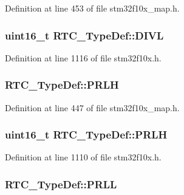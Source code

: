 Definition at line 453 of file stm32f10x\+\_\+map.\+h.

\subsubsection[{\texorpdfstring{D\+I\+VL}{DIVL}}]{ {\bf uint16\+\_\+t} R\+T\+C\+\_\+\+Type\+Def\+::\+D\+I\+VL}\hypertarget{struct_r_t_c___type_def_ad0c75a7cc4e925da0faedcd8860cb43a}{}\label{struct_r_t_c___type_def_ad0c75a7cc4e925da0faedcd8860cb43a}


Definition at line 1116 of file stm32f10x.\+h.

\subsubsection[{\texorpdfstring{P\+R\+LH}{PRLH}}]{ R\+T\+C\+\_\+\+Type\+Def\+::\+P\+R\+LH}\hypertarget{struct_r_t_c___type_def_aad7497095513a3ff014d992635749a6b}{}\label{struct_r_t_c___type_def_aad7497095513a3ff014d992635749a6b}


Definition at line 447 of file stm32f10x\+\_\+map.\+h.

\subsubsection[{\texorpdfstring{P\+R\+LH}{PRLH}}]{ {\bf uint16\+\_\+t} R\+T\+C\+\_\+\+Type\+Def\+::\+P\+R\+LH}\hypertarget{struct_r_t_c___type_def_a831b0b55bae7921faa7d16c6f3160449}{}\label{struct_r_t_c___type_def_a831b0b55bae7921faa7d16c6f3160449}


Definition at line 1110 of file stm32f10x.\+h.

\subsubsection[{\texorpdfstring{P\+R\+LL}{PRLL}}]{ R\+T\+C\+\_\+\+Type\+Def\+::\+P\+R\+LL}\hypertarget{struct_r_t_c___type_def_a9b6eaa7ffd3f91456d66fb0a1d629e6e}{}\label{struct_r_t_c___type_def_a9b6eaa7ffd3f91456d66fb0a1d629e6e}


